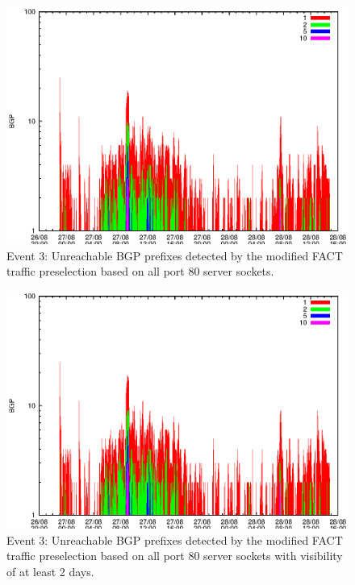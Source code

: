 \begin{figure}
	[p] \centering 
	\includegraphics[width=0.75\linewidth]{images/events/2010_08_27/bgp_log_allPort80SES.eps}
	\caption{Event 3: Unreachable BGP prefixes detected by the modified FACT traffic preselection based on all port 80 server sockets.} 
	\label{fig:RIPE_FACT_allSES80} 
\end{figure}


\begin{figure}
	[p] \centering 
	\includegraphics[width=0.75\linewidth]{images/events/2010_08_27/bgp_log_port80_Set_stab_0_vts_2.eps}
	\caption{Event 3: Unreachable BGP prefixes detected by the modified FACT traffic preselection based on all port 80 server sockets with visibility of at least 2 days.} 
	\label{fig:RIPE_FACT_allSES80VTS2} 
\end{figure}

